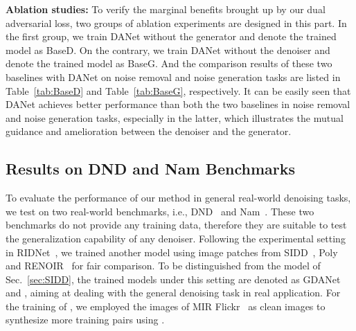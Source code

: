 \documentclass[runningheads]{llncs}
\begin{document}
\vspace{2mm}\noindent\textbf{Ablation studies:} To verify the marginal benefits brought up by our dual adversarial loss,
two groups of ablation experiments are designed in this part. In the first group, we train DANet without the generator and denote
the trained model as BaseD. On the contrary, we train DANet without the denoiser and denote the trained model as BaseG. 
And the comparison results of these two baselines with DANet on noise removal and noise generation tasks are listed in Table~\ref{tab:BaseD}  and
Table~\ref{tab:BaseG}, respectively. It can be easily seen that DANet achieves better performance than both the two baselines in
noise removal and noise generation tasks, especially in the latter, which illustrates the mutual guidance and amelioration between
the denoiser and the generator.
\subsection{Results on DND and Nam Benchmarks}\label{sec:other-benchmark}
To evaluate the performance of our method in general real-world denoising tasks, we test on two real-world
benchmarks, i.e., DND~\cite{plotz2017benchmarking} and Nam~\cite{nam2016holistic}.
These two benchmarks do not provide any training data, therefore they are suitable to test the
generalization capability of any denoiser. Following the experimental setting in RIDNet~\cite{anwar2019real}, we
trained another model using  image patches from SIDD~\cite{SIDD_2018_CVPR}, Poly~\cite{xu2018real}
and RENOIR~\cite{Anaya2014} for fair comparison. To be distinguished from the model of Sec.~\ref{sec:SIDD}, the
trained models under this setting are denoted as GDANet and , aiming at dealing with the
general denoising task in real application. For the training of , we employed the images of
MIR Flickr~\cite{Huiskes2010} as clean images to synthesize more training pairs using .
\end{document}

